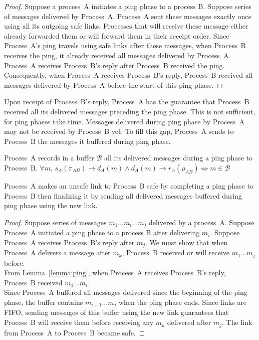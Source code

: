 \begin{proof}
  Suppose a process~A initiates a ping phase to a process B. Suppose series of
  messages delivered by Process~A. Process~A sent these messages exactly once
  using all its outgoing safe links. Processes that will receive these message
  either already forwarded them or will forward them in their receipt
  order. Since Process~A's ping travels using safe links after these messages,
  when Process~B receives the ping, it already received all messages delivered
  by Process~A. Process~A receives Process~B's reply after Process~B received
  the ping. Consequently, when Process~A receives Process~B's reply, Process~B
  received all messages delivered by Process~A before the start of this ping
  phase.
\end{proof}

Upon receipt of Process~B's reply, Process~A has the guarantee that Process~B
received all its delivered messages preceding the ping phase. This is not
sufficient, for ping phases take time. Messages delivered during ping phase by
Process~A may not be received by Process~B yet. To fill this gap, Process~A
sends to Process~B the messages it buffered during ping phase.

\begin{definition}[Buffering]
  Process~A records in a buffer $\mathcal{B}$ all its delivered messages during
  a ping phase to Process~B.
  $\forall m,\, s_A(\pi_{AB}) \rightarrow d_A(m) \wedge d_A(m)\rightarrow
  r_A(\rho_{AB}) \Leftrightarrow m \in \mathcal{B} $
\end{definition}


\begin{lemma}
  Process~A makes an unsafe link to Process~B safe by completing a ping phase to
  Process~B then finalizing it by sending all delivered messages buffered during
  ping phase using the new link.
\end{lemma}

\begin{proof}
  Suppose series of messages $m_1 \ldots m_i \ldots m_j$ delivered by a
  process~A. Suppose Process~A initiated a ping phase to a process B after
  delivering $m_i$. Suppose Process~A receives Process~B's reply after $m_j$.
  We must show that when Process~A delivers a message after $m_k$, Process~B
  received or will receive $m_1 \ldots m_j$ before. \\
  From Lemma~\ref{lemma:ping}, when Process~A receives Process~B's reply,
  Process~B received $m_1 \ldots m_i$. \\
  Since Process~A buffered all messages delivered since the beginning of the
  ping phase, the buffer contains $m_{i+1} \ldots m_j$ when the ping phase ends.
  Since links are FIFO, sending messages of this buffer using the new link
  guarantees that Process~B will receive them before receiving any $m_k$
  delivered after $m_j$. The link from Process~A to Process~B became safe.
\end{proof}


